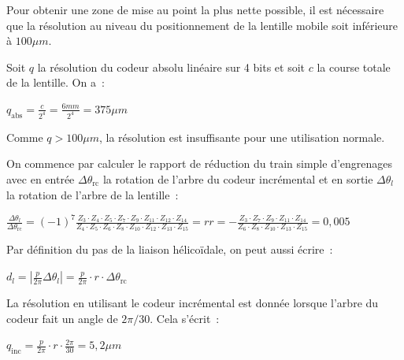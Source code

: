 Pour obtenir une zone de mise au point la plus nette possible, il est
nécessaire que la résolution au niveau du positionnement de la lentille
mobile soit inférieure à $100\mu m$.

\ifprof
\begin{corrige}
Soit \(q\) la résolution du codeur absolu linéaire sur 4 bits et soit \(c\) la course totale de la lentille. On a~:

\(q_{\text{abs}} = \frac{c}{2^{4}}= \frac{6mm}{2^{4}} = 375\mu m\)

Comme \(q > 100\mu m\), la résolution est insuffisante pour une
utilisation normale.
\end{corrige}
\else
\fi



\ifprof
\begin{corrige}
On commence par calculer le rapport de réduction du train simple
  d'engrenages avec en entrée \(\Delta\theta_{\text{rc}}\) la rotation
  de l'arbre du codeur incrémental et en sortie \(\Delta\theta_{l}\) la
  rotation de l'arbre de la lentille~:

\({\frac{\Delta\theta_{l}}{\Delta\theta_{\text{rc}}} = \left( - 1 \right)^{7}\frac{Z_{3} \cdot Z_{4} \cdot Z_{5} \cdot Z_{7} \cdot Z_{9} \cdot Z_{11} \cdot Z_{12} \cdot Z_{14}}{Z_{4} \cdot Z_{5} \cdot Z_{6} \cdot Z_{8} \cdot Z_{10} \cdot Z_{12} \cdot Z_{13} \cdot Z_{15}} = r}\)\({r = - \frac{Z_{3} \cdot Z_{7} \cdot Z_{9} \cdot Z_{11} \cdot Z_{14}}{Z_{6} \cdot Z_{8} \cdot Z_{10} \cdot Z_{13} \cdot Z_{15}} = 0,005}\)

Par définition du pas de la liaison hélicoïdale, on peut aussi écrire~:

\(d_{l} = \left| \frac{p}{2\pi}\Delta\theta_{l} \right| = \frac{p}{2\pi} \cdot r \cdot \Delta\theta_{\text{rc}}\)

La résolution en utilisant le codeur incrémental est donnée lorsque
l'arbre du codeur fait un angle de \(2\pi/30\). Cela s'écrit~:

\(q_{\text{inc}} = \frac{p}{2\pi} \cdot r \cdot \frac{2\pi}{30} = 5,2\mu m\)

\end{corrige}
\else
\fi


